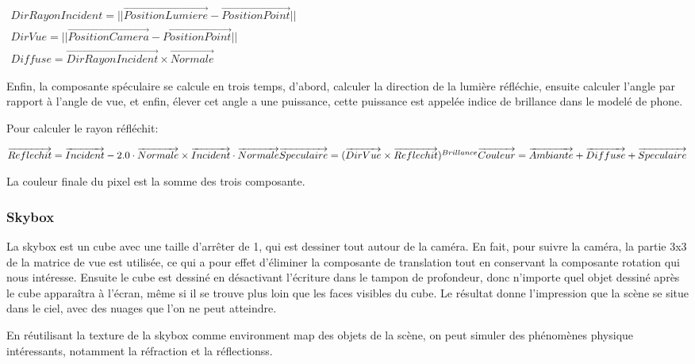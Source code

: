 \documentclass[pdftex, 11pt, a4paper, titlepage]{article}
\newcommand{\vect}[1]{\overrightarrow{#1}}
\begin{document}
\begin{math}
  \begin{matrix}
    DirRayonIncident = ||\vect{PositionLumiere} -  \vect{PositionPoint}||\\
    DirVue = ||\vect{PositionCamera} -  \vect{PositionPoint}|| \\
    Diffuse = \vect{DirRayonIncident} \times \vect{Normale}
  \end{matrix}
\end{math}

Enfin, la composante spéculaire se calcule en trois temps, d'abord, calculer
la direction de la lumière réfléchie, ensuite calculer l'angle par rapport à 
l'angle de vue, et enfin, élever cet angle a une puissance, cette puissance
est appelée indice de brillance dans le modelé de phone.

Pour calculer le rayon réfléchit:

\begin{math}
\vect{Reflechit} = \vect{Incident} - 2.0 \cdot \vect{Normale} \times \vect{Incident} \cdot \vect{Normale} \\
\vect{Speculaire} = (\vect{DirVue} \times  \vect{Reflechit})^{Brillance} \\
\vect{Couleur} = \vect{Ambiante} + \vect{Diffuse} + \vect{Speculaire}
\end{math}

La couleur finale du pixel est la somme des trois composante.

\subsubsection{Skybox}

La skybox est un cube avec une taille d'arrêter de 1, qui est dessiner tout
 autour de la caméra. En fait, pour suivre la caméra, la partie 3x3 de 
la matrice de vue est utilisée, ce qui a pour effet d'éliminer la
 composante de translation tout en conservant la composante rotation 
qui nous intéresse. Ensuite le cube est dessiné en désactivant l'écriture
 dans le tampon de profondeur, donc n'importe quel objet dessiné après le 
cube apparaîtra à l'écran, même si il se trouve plus loin que les faces
 visibles du cube. Le résultat donne l'impression que la scène se situe
 dans le ciel, avec des nuages que l'on ne peut atteindre.

En réutilisant la texture de la skybox comme environment map des objets 
de la scène, on peut simuler des phénomènes physique intéressants, 
notamment la réfraction et la réflectionss.
\end{document}
